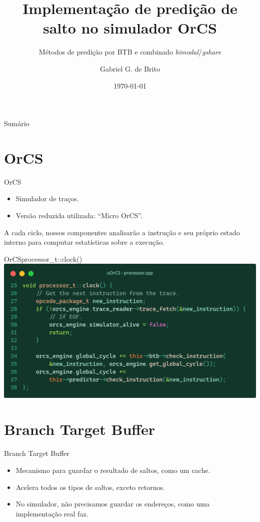 \documentclass{beamer}
\title{Implementação de predição de salto no simulador OrCS}
\subtitle[]{Métodos de predição por BTB e combinado \textit{bimodal}/\textit{gshare}}
\author{Gabriel G. de Brito}
\institute[UFPR]{Universidade Federal do Paraná}
\date{\today}
\begin{document}
\begin{frame}
	\titlepage
\end{frame}

\begin{frame}{Sumário}
	\tableofcontents
\end{frame}

\section{OrCS}

\begin{frame}{OrCS}
	\begin{itemize}
		\item Simulador de traços.
		\item Versão reduzida utilizada: ``Micro OrCS''.
	\end{itemize}

	\vfill

	A cada ciclo, nossos componentes analisarão a instrução e seu próprio estado
	interno para computar estatísticas sobre a execução.
\end{frame}

\begin{frame}{OrCS}{processor\_t::clock()}
	\includegraphics[width=\textwidth]{processor_t-clock.png}
\end{frame}

\section{Branch Target Buffer}

\begin{frame}{Branch Target Buffer}
	\begin{itemize}
		\item Mecanismo para guardar o resultado de saltos, como um cache.
		\item Acelera todos os tipos de saltos, exceto retornos.
		\item No simulador, não precisamos guardar os endereços, como uma
		      implementação real faz.
	\end{itemize}
\end{frame}
\end{document}
